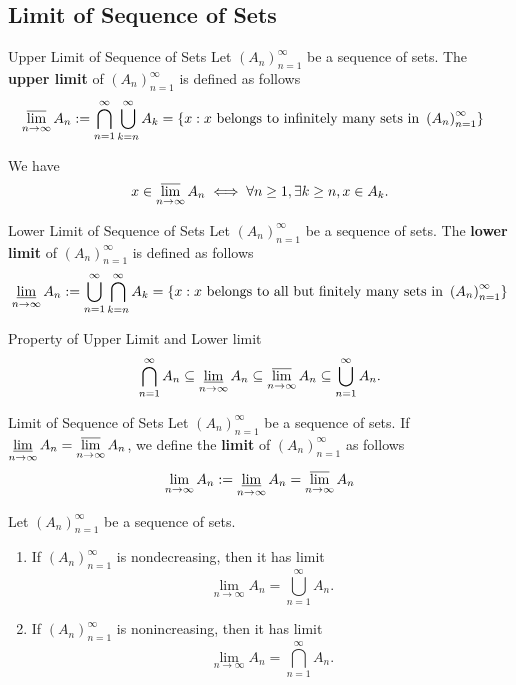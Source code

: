 \subsection{Limit of Sequence of Sets}
\begin{definition}{Upper Limit of Sequence of Sets}{}
	Let $\left(A_n\right)_{n=1}^{\infty}$ be a sequence of sets. The \textbf{upper limit} of $\left(A_n\right)_{n=1}^{\infty}$ is defined as follows
	\begin{align*}
		\operatorname*{\overline{lim}}_{n\to\infty}A_n&:=\bigcap_{n=1}^\infty\bigcup_{k=n}^\infty A_k=\left\{x:x\text{ belongs to infinitely many sets in }\left(A_n\right)_{n=1}^{\infty}\right\}
	\end{align*}
\end{definition}

We have
\[
	x\in \operatorname*{\overline{lim}}_{n\to\infty}A_n\iff \forall n\ge1,\exists k\ge n,x\in A_k.
\]

\begin{definition}{Lower Limit of Sequence of Sets}{}
	Let $\left(A_n\right)_{n=1}^{\infty}$ be a sequence of sets. The \textbf{lower limit} of $\left(A_n\right)_{n=1}^{\infty}$ is defined as follows
	\begin{align*}
		\operatorname*{\underline{lim}}_{n\to\infty}A_n&:=\bigcup_{n=1}^\infty\bigcap_{k=n}^\infty A_k=\left\{x:x\text{ belongs to all but finitely many sets in }\left(A_n\right)_{n=1}^{\infty}\right\}\\
	\end{align*}
\end{definition}

\begin{proposition}{Property of Upper Limit and Lower limit}{}
	\[
		\bigcap_{n=1}^\infty A_n\subseteq\operatorname*{\underline{lim}}_{n\to\infty}A_n\subseteq\operatorname*{\overline{lim}}_{n\to\infty}A_n\subseteq \bigcup_{n=1}^\infty A_n.
	\]
\end{proposition}

\begin{definition}{Limit of Sequence of Sets}{}
	Let $\left(A_n\right)_{n=1}^{\infty}$ be a sequence of sets. If 
	$\operatorname*{\underline{lim}}\limits_{n\to\infty}A_n=\operatorname*{\overline{lim}}\limits_{n\to\infty}A_n$, we define the \textbf{limit} of $\left(A_n\right)_{n=1}^{\infty}$ as follows 
	\[
		\lim\limits_{n\to\infty}A_n:=\operatorname*{\underline{lim}}\limits_{n\to\infty}A_n=\operatorname*{\overline{lim}}\limits_{n\to\infty}A_n
	\]
\end{definition}

\begin{proposition}{}{}
	Let $\left(A_n\right)_{n=1}^{\infty}$ be a sequence of sets.
	\begin{enumerate}
		\item If $\left(A_n\right)_{n=1}^{\infty}$ is nondecreasing, then it has limit
		\[
			\lim\limits_{n\to\infty}A_n=\bigcup_{n=1}^\infty A_n.
		\]
		\item If $\left(A_n\right)_{n=1}^{\infty}$ is nonincreasing, then it has limit
		\[
			\lim\limits_{n\to\infty}A_n=\bigcap_{n=1}^\infty A_n.
		\]
	\end{enumerate}
\end{proposition}


